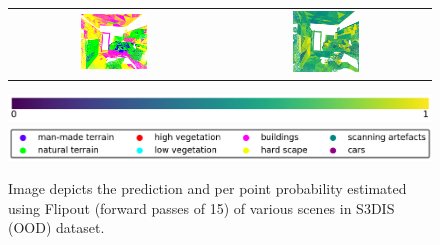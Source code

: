 \begin{figure}[h!]
\begin{tabular}{cc}
            \includegraphics[width=0.33\textwidth, height=0.18\textheight]{images/seg_output/s3dis_DE/office_42.pdf}& 
            \includegraphics[width=0.33\textwidth, height=0.18\textheight]{images/seg_output/s3dis_DE/fout_4.png}\\
        \end{tabular}
        \includegraphics[scale=0.45]{images/prob_legend.pdf}
        \includegraphics[scale=0.45]{images/legend.png}
        \caption{Image depicts the prediction and per point probability estimated using Flipout (forward passes of 15) of various scenes in S3DIS (OOD) dataset.}
        \label{fig:fout_s3dis_probmap}
    \end{figure}

    \FloatBarrier
